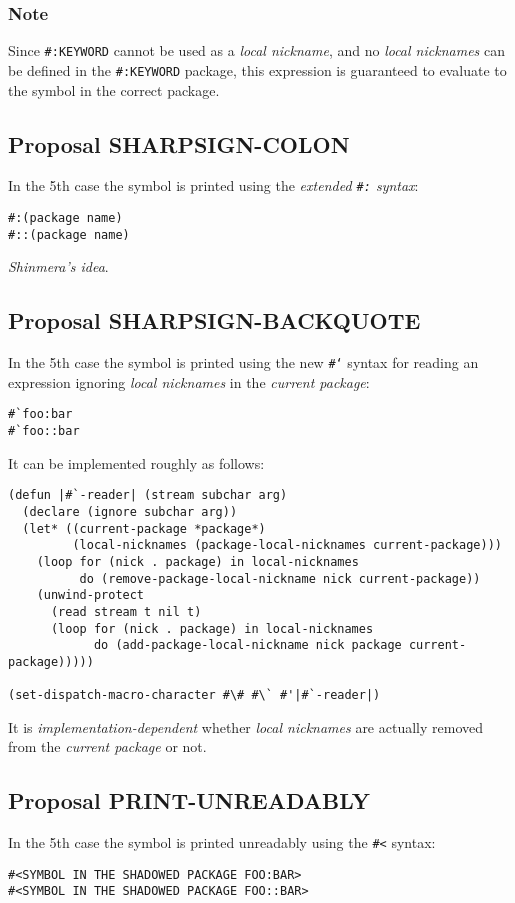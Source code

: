 \documentclass[11pt]{article}
\begin{document}
\subsubsection{Note}
\label{sec:org6da97ab}
Since \texttt{\#:KEYWORD} cannot be used as a \emph{local nickname}, and no \emph{local nicknames}
can be defined in the \texttt{\#:KEYWORD} package, this expression is guaranteed to
evaluate to the symbol in the correct package.
\subsection{Proposal SHARPSIGN-COLON}
\label{sec:org2955dbc}
In the 5th case the symbol is printed using the \emph{extended \texttt{\#:} syntax}:
\begin{verbatim}
#:(package name)
#::(package name)
\end{verbatim}

\emph{Shinmera's idea}.
\subsection{Proposal SHARPSIGN-BACKQUOTE}
\label{sec:orgdbf8b68}
In the 5th case the symbol is printed using the new \texttt{\#`} syntax for reading an
expression ignoring \emph{local nicknames} in the \emph{current package}:
\begin{verbatim}
#`foo:bar
#`foo::bar
\end{verbatim}

It can be implemented roughly as follows:
\begin{verbatim}
(defun |#`-reader| (stream subchar arg)
  (declare (ignore subchar arg))
  (let* ((current-package *package*)
         (local-nicknames (package-local-nicknames current-package)))
    (loop for (nick . package) in local-nicknames
          do (remove-package-local-nickname nick current-package))
    (unwind-protect
      (read stream t nil t)
      (loop for (nick . package) in local-nicknames
            do (add-package-local-nickname nick package current-package)))))

(set-dispatch-macro-character #\# #\` #'|#`-reader|)
\end{verbatim}
It is \emph{implementation-dependent} whether \emph{local nicknames} are actually removed from
the \emph{current package} or not.
\subsection{Proposal PRINT-UNREADABLY}
\label{sec:org067a74e}
In the 5th case the symbol is printed unreadably using the \texttt{\#<} syntax:
\begin{verbatim}
#<SYMBOL IN THE SHADOWED PACKAGE FOO:BAR>
#<SYMBOL IN THE SHADOWED PACKAGE FOO::BAR>
\end{verbatim}
\end{document}
